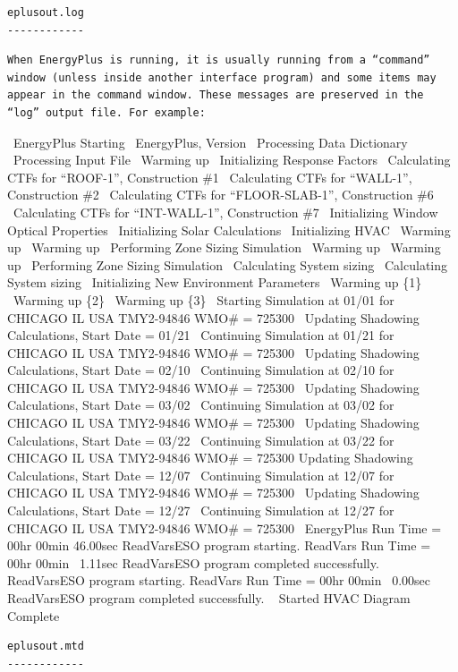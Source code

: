 \begin{lstlisting}
eplusout.log
------------
\end{lstlisting}

\begin{lstlisting}
When EnergyPlus is running, it is usually running from a “command” window (unless inside another interface program) and some items may appear in the command window. These messages are preserved in the “log” output file. For example:
\end{lstlisting}

~EnergyPlus Starting ~EnergyPlus, Version ~Processing Data Dictionary ~Processing Input File ~Warming up ~Initializing Response Factors ~Calculating CTFs for ``ROOF-1'', Construction \#1 ~Calculating CTFs for ``WALL-1'', Construction \#2 ~Calculating CTFs for ``FLOOR-SLAB-1'', Construction \#6 ~Calculating CTFs for ``INT-WALL-1'', Construction \#7 ~Initializing Window Optical Properties ~Initializing Solar Calculations ~Initializing HVAC ~Warming up ~Warming up ~Performing Zone Sizing Simulation ~Warming up ~Warming up ~Performing Zone Sizing Simulation ~Calculating System sizing ~Calculating System sizing ~Initializing New Environment Parameters ~Warming up \{1\} ~Warming up \{2\} ~Warming up \{3\} ~Starting Simulation at 01/01 for CHICAGO IL USA TMY2-94846 WMO\# = 725300 ~Updating Shadowing Calculations, Start Date = 01/21 ~Continuing Simulation at 01/21 for CHICAGO IL USA TMY2-94846 WMO\# = 725300 ~Updating Shadowing Calculations, Start Date = 02/10 ~Continuing Simulation at 02/10 for CHICAGO IL USA TMY2-94846 WMO\# = 725300 ~Updating Shadowing Calculations, Start Date = 03/02 ~Continuing Simulation at 03/02 for CHICAGO IL USA TMY2-94846 WMO\# = 725300 ~Updating Shadowing Calculations, Start Date = 03/22 ~Continuing Simulation at 03/22 for CHICAGO IL USA TMY2-94846 WMO\# = 725300 Updating Shadowing Calculations, Start Date = 12/07 ~Continuing Simulation at 12/07 for CHICAGO IL USA TMY2-94846 WMO\# = 725300 ~Updating Shadowing Calculations, Start Date = 12/27 ~Continuing Simulation at 12/27 for CHICAGO IL USA TMY2-94846 WMO\# = 725300 ~EnergyPlus Run Time = 00hr 00min 46.00sec ReadVarsESO program starting. ReadVars Run Time = 00hr 00min~ 1.11sec ReadVarsESO program completed successfully. ReadVarsESO program starting. ReadVars Run Time = 00hr 00min~ 0.00sec ReadVarsESO program completed successfully. ~ Started HVAC Diagram ~ Complete

\begin{lstlisting}
eplusout.mtd
------------
\end{lstlisting}


